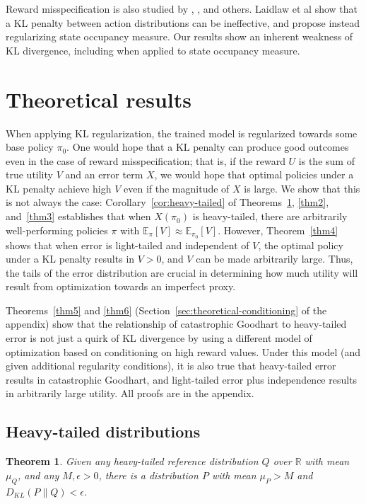\documentclass{article}
\theoremstyle{plain}
\newtheorem{theorem}{Theorem}
\theoremstyle{definition}
\theoremstyle{remark}
\begin{document}
Reward misspecification is also studied by \citep{lambert2024alignment}, \citep{laidlaw2024preventing}, and others. Laidlaw et al show that a KL penalty between action distributions can be ineffective, and propose instead regularizing state occupancy measure. Our results show an inherent weakness of KL divergence, including when applied to state occupancy measure.

\section{Theoretical results}

When applying KL regularization, the trained model is regularized towards some base policy $\pi_0$. One would hope that a KL penalty can produce good outcomes even in the case of reward misspecification; that is, if the reward $U$ is the sum of true utility $V$ and an error term $X$, we would hope that optimal policies under a KL penalty achieve high $V$ even if the magnitude of $X$ is large. We show that this is not always the case: Corollary~\ref{cor:heavy-tailed} of Theorems~\ref{thm1}, \ref{thm2}, and~\ref{thm3} establishes that when $X(\pi_0)$ is heavy-tailed, there are arbitrarily well-performing policies $\pi$ with $\mathbb E_{\pi}[V] \approx \mathbb E_{\pi_0}[V]$. However, Theorem~\ref{thm4} shows that when error is light-tailed and independent of $V$, the optimal policy under a KL penalty results in $V > 0$, and $V$ can be made arbitrarily large. Thus, the tails of the error distribution are crucial in determining how much utility will result from optimization towards an imperfect proxy.

Theorems~\ref{thm5} and \ref{thm6} (Section~\ref{sec:theoretical-conditioning} of the appendix) show that the relationship of catastrophic Goodhart to heavy-tailed error is not just a quirk of KL divergence by using a different model of optimization based on conditioning on high reward values. Under this model (and given additional regularity conditions), it is also true that heavy-tailed error results in catastrophic Goodhart, and light-tailed error plus independence results in arbitrarily large utility. All proofs are in the appendix.

\subsection{Heavy-tailed distributions}
\begin{theorem}
\label{thm1}
Given any heavy-tailed reference distribution
\(Q\) over \(\mathbb R\) with mean \(\mu_Q\), and any
\(M, \epsilon > 0\), there is a distribution \(P\) with mean \(\mu_P>M\)
and \(D_{KL}(P \| Q) < \epsilon\).
\end{theorem}
\end{document}
